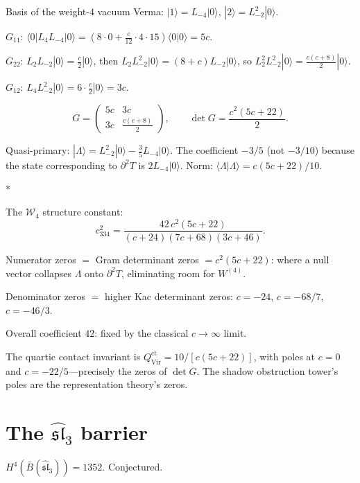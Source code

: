 \documentclass[11pt]{article}
\newcommand{\cW}{\mathcal{W}}
\newcommand{\fsl}{\mathfrak{sl}}
\newcommand{\B}{\bar{B}}
\newcommand{\sep}{\bigskip\begin{center}$*$\end{center}\medskip}
\begin{document}
Basis of the weight-$4$ vacuum Verma:
$|1\rangle = L_{-4}|0\rangle$,
$|2\rangle = L_{-2}^2|0\rangle$.

$G_{11}$: $\langle 0| L_4 L_{-4}|0\rangle
= (8 \cdot 0 + \tfrac{c}{12} \cdot 4 \cdot 15)\langle 0|0\rangle
= 5c$.

$G_{22}$: $L_2 L_{-2}|0\rangle = \tfrac{c}{2}|0\rangle$,
then $L_2 L_{-2}^2|0\rangle = (8+c)L_{-2}|0\rangle$, so
$L_2^2 L_{-2}^2|0\rangle = \tfrac{c(c+8)}{2}|0\rangle$.

$G_{12}$: $L_4 L_{-2}^2|0\rangle = 6 \cdot \tfrac{c}{2}|0\rangle
= 3c$.

\[
G = \begin{pmatrix} 5c & 3c \\ 3c & \tfrac{c(c+8)}{2} \end{pmatrix},
\qquad
\det G = \frac{c^2(5c+22)}{2}.
\]

Quasi-primary: $|\Lambda\rangle = L_{-2}^2|0\rangle
- \tfrac{3}{5}L_{-4}|0\rangle$.  The coefficient $-3/5$
(not $-3/10$) because the state corresponding to
$\partial^2 T$ is $2L_{-4}|0\rangle$.
Norm: $\langle\Lambda|\Lambda\rangle = c(5c+22)/10$.

\sep

The $\cW_4$ structure constant:
\begin{equation}\label{eq:c334}
c_{334}^2 = \frac{42\,c^2(5c+22)}{(c+24)(7c+68)(3c+46)}.
\end{equation}

Numerator zeros $=$ Gram determinant zeros $= c^2(5c+22)$:
where a null vector collapses $\Lambda$ onto $\partial^2 T$,
eliminating room for $W^{(4)}$.

Denominator zeros $=$ higher Kac determinant zeros:
$c = -24$, $c = -68/7$, $c = -46/3$.

Overall coefficient $42$: fixed by the classical
$c \to \infty$ limit.

The quartic contact invariant is
$Q^{\mathrm{ct}}_{\mathrm{Vir}} = 10/[c(5c+22)]$, with poles at
$c = 0$ and $c = -22/5$---precisely the zeros of $\det G$.
The shadow obstruction tower's poles are the representation theory's zeros.


\section{The $\widehat{\fsl}_3$ barrier}
\label{sec:sl3-barrier}

$H^4(\B(\widehat{\fsl}_3)) = 1352$.  Conjectured.
\end{document}
